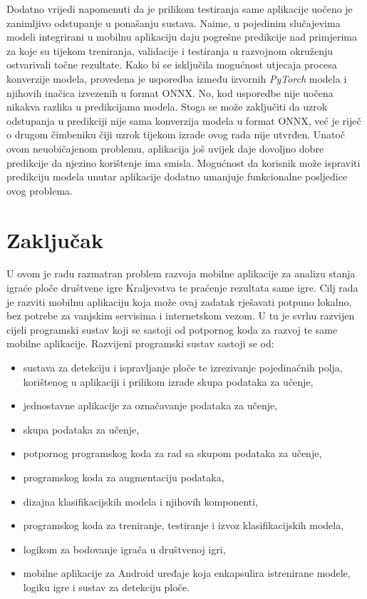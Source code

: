 \documentclass[diplomskirad]{fer}
\begin{document}
			Dodatno vrijedi napomenuti da je prilikom testiranja same aplikacije uočeno je zanimljivo odstupanje u ponašanju sustava. Naime, u pojedinim slučajevima modeli integrirani u mobilnu aplikaciju daju pogrešne predikcije nad primjerima za koje su tijekom treniranja, validacije i testiranja u razvojnom okruženju ostvarivali točne rezultate. Kako bi se isključila mogućnost utjecaja procesa konverzije modela, provedena je usporedba između izvornih \textit{PyTorch} modela i njihovih inačica izvezenih u format ONNX. No, kod usporedbe nije uočena nikakva razlika u predikcijama modela. Stoga se može zaključiti da uzrok odstupanja u predikciji nije sama konverzija modela u format ONNX, već je riječ o drugom čimbeniku čiji uzrok tijekom izrade ovog rada nije utvrđen. Unatoč ovom neuobičajenom problemu, aplikacija još uvijek daje dovoljno dobre predikcije da njezino korištenje ima smisla. Mogućnost da korisnik može ispraviti predikciju modela unutar aplikacije dodatno umanjuje funkcionalne posljedice ovog problema.


\chapter{Zaključak}
\label{pog:zakljucak}

	U ovom je radu razmatran problem razvoja mobilne aplikacije za analizu stanja igraće ploče društvene igre Kraljevstva te praćenje rezultata same igre. Cilj rada je razviti mobilnu aplikaciju koja može ovaj zadatak rješavati potpuno lokalno, bez potrebe za vanjskim servisima i internetskom vezom. U tu je svrhu razvijen cijeli programski sustav koji se sastoji od potpornog koda za razvoj te same mobilne aplikacije. Razvijeni programski sustav sastoji se od:
	\begin{itemize}
		\item sustava za detekciju i ispravljanje ploče te izrezivanje pojedinačnih polja, korištenog u aplikaciji i prilikom izrade skupa podataka za učenje,
		\item jednostavne aplikacije za označavanje podataka za učenje,
		\item skupa podataka za učenje,
		\item potpornog programskog koda za rad sa skupom podataka za učenje,
		\item programskog koda za augmentaciju podataka,
		\item dizajna klasifikacijskih modela i njihovih komponenti,
		\item programskog koda za treniranje, testiranje i izvoz klasifikacijskih modela,
		\item logikom za bodovanje igrača u društvenoj igri,
		\item mobilne aplikacije za Android uređaje koja enkapsulira istrenirane modele, logiku igre i sustav za detekciju ploče.
	\end{itemize}
\end{document}
